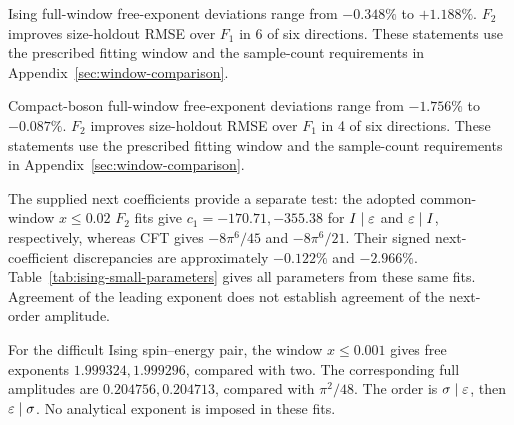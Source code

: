 Ising full-window free-exponent deviations range from $-0.348\%$ to $+1.188\%$. $F_2$ improves size-holdout RMSE over $F_1$ in 6 of six directions. These statements use the prescribed fitting window and the sample-count requirements in Appendix~\ref{sec:window-comparison}.\par
Compact-boson full-window free-exponent deviations range from $-1.756\%$ to $-0.087\%$. $F_2$ improves size-holdout RMSE over $F_1$ in 4 of six directions. These statements use the prescribed fitting window and the sample-count requirements in Appendix~\ref{sec:window-comparison}.\par
The supplied next coefficients provide a separate test: the adopted common-window $x\leq0.02$ $F_2$ fits give $c_1=-170.71,-355.38$ for $I\mid\varepsilon$ and $\varepsilon\mid I$, respectively, whereas CFT gives $-8\pi^6/45$ and $-8\pi^6/21$. Their signed next-coefficient discrepancies are approximately $-0.122\%$ and $-2.966\%$. Table~\ref{tab:ising-small-parameters} gives all parameters from these same fits. Agreement of the leading exponent does not establish agreement of the next-order amplitude.\par
For the difficult Ising spin--energy pair, the window $x\leq0.001$ gives free exponents $1.999324,1.999296$, compared with two. The corresponding full amplitudes are $0.204756,0.204713$, compared with $\pi^2/48$. The order is $\sigma\mid\varepsilon$, then $\varepsilon\mid\sigma$. No analytical exponent is imposed in these fits.\par
